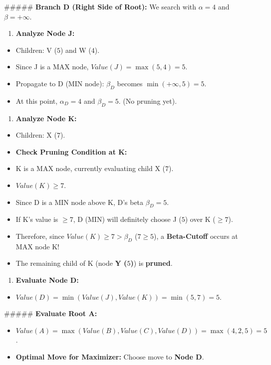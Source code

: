 \#\#\#\#\# \textbf{Branch D (Right Side of Root):}
We search with $\alpha = 4$ and $\beta = +\infty$.
\begin{enumerate}
  \item \textbf{Analyze Node J:}
\end{enumerate}
\begin{itemize}
  \item   Children: V ($5$) and W ($4$).
  \item   Since J is a MAX node, $Value(J) = \max(5, 4) = 5$.
  \item   Propagate to D (MIN node): $\beta_D$ becomes $\min(+\infty, 5) = 5$.
  \item   At this point, $\alpha_D = 4$ and $\beta_D = 5$. (No pruning yet).
\end{itemize}
\begin{enumerate}
  \item \textbf{Analyze Node K:}
\end{enumerate}
\begin{itemize}
  \item   Children: X ($7$).
  \item   \textbf{Check Pruning Condition at K:}
  \item   K is a MAX node, currently evaluating child X ($7$).
  \item   $Value(K) \ge 7$.
  \item   Since D is a MIN node above K, D's beta $\beta_D = 5$.
  \item   If K's value is $\ge 7$, D (MIN) will definitely choose J ($5$) over K ($\ge 7$).
  \item   Therefore, since $Value(K) \ge 7 > \beta_D$ ($7 \ge 5$), a \textbf{Beta-Cutoff} occurs at MAX node K!
  \item   The remaining child of K (node \textbf{Y ($5$)}) is \textbf{pruned}.
\end{itemize}
\begin{enumerate}
  \item \textbf{Evaluate Node D:}
\end{enumerate}
\begin{itemize}
  \item   $Value(D) = \min(Value(J), Value(K)) = \min(5, 7) = 5$.
\end{itemize}


\#\#\#\#\# \textbf{Evaluate Root A:}
\begin{itemize}
  \item   $Value(A) = \max(Value(B), Value(C), Value(D)) = \max(4, 2, 5) = 5$.
  \item   \textbf{Optimal Move for Maximizer:} Choose move to \textbf{Node D}.
\end{itemize}


